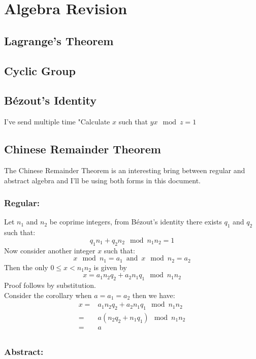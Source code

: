 
\section{Algebra Revision}
\subsection{Lagrange's Theorem}
\subsection{Cyclic Group}
\subsection{Bézout's Identity}
I've send multiple time "Calculate $x$ such that $yx \mod z = 1$

\subsection{Chinese Remainder Theorem}
The Chinese Remainder Theorem is an interesting bring between regular and abstract algebra and I'll be using both forms in this document.

\subsubsection{Regular:}
Let $n_1$ and $n_2$ be coprime integers,
from Bézout's identity there exists $q_1$ and $q_2$ such that:
\[q_1n_1+q_2n_2 \mod n_1n_2 = 1\]
Now consider another integer $x$ such that:
\[x\mod n_1 = a_1\, \text{ and }\, x\mod n_2 = a_2\]
Then the only $0\leq x < n_1n_2$ is given by
\[x = a_1n_2q_2+a_2n_1q_1\mod n_1n_2\]
Proof follows by substitution.
\\

Consider the corollary when $a=a_1=a_2$ then we have:
\begin{equation*}
\begin{aligned}
x =& a_1n_2q_2+a_2n_1q_1\mod n_1n_2\\
=& a(n_2q_2+n_1q_1)\mod n_1n_2\\
=& a\\
\end{aligned}
\end{equation*}

\subsubsection{Abstract:}

